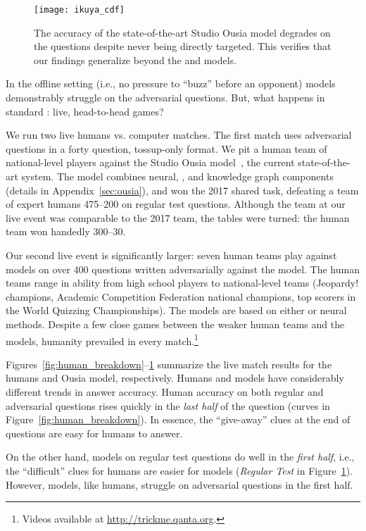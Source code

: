 \begin{figure}[t!]
\centering
\texttt{[image: ikuya\_cdf]}
\caption{The accuracy of the state-of-the-art Studio Ousia model
  degrades on the \challenge{} questions despite never being directly
  targeted. This verifies that our findings generalize beyond the
   and  models.}
\label{fig:ikuya_vs_human}
\end{figure}

In the offline setting (i.e., no pressure to ``buzz'' before an opponent) models
demonstrably struggle on the adversarial questions. But, what happens in
standard \qb{}: live, head-to-head 
games? 

We run two live humans vs. computer matches. The first match uses 
adversarial questions in a forty question, tossup-only \qb{} format. 
We pit a human team of national-level \qb{} players against the
Studio Ousia model~\cite{yamada2018studio},
the current state-of-the-art \qb{} system. The model combines neural,
, and knowledge graph components (details in Appendix~\ref{sec:ousia}), and won the 2017  shared task, defeating
a team of expert humans 475--200 on regular \qb{} test questions.
Although the
team at our live event was comparable to the 
2017 team, the tables were turned: the human team won handedly 300--30.

Our second live event is significantly larger: seven human teams play
against models on over 400 questions written adversarially against the
 model. The human teams range in ability from high school
\qb{} players to national-level teams (Jeopardy! champions, Academic
Competition Federation national champions, top scorers in the World
Quizzing Championships). The models are based on either  or
neural methods. Despite a few close games between the weaker human
teams and the models, humanity prevailed in every
match.\footnote{Videos available at \url{http://trickme.qanta.org}.}

Figures~\ref{fig:human_breakdown}--\ref{fig:ikuya_vs_human} summarize
the live match results for the humans and Ousia model, respectively. Humans
and models have considerably different trends in answer accuracy.
Human accuracy on both regular and adversarial questions rises
quickly in the \emph{last half}
of the question (curves in Figure~\ref{fig:human_breakdown}).
In essence, the ``give-away'' clues at the end of questions are easy for humans to answer.

On the other hand, models on regular test questions
do well in the \emph{first half}, i.e.,
the ``difficult'' clues for humans are easier for models (\emph{Regular Test} in Figure~\ref{fig:ikuya_vs_human}).
However, models, like humans, struggle on 
 adversarial questions in the first half.
